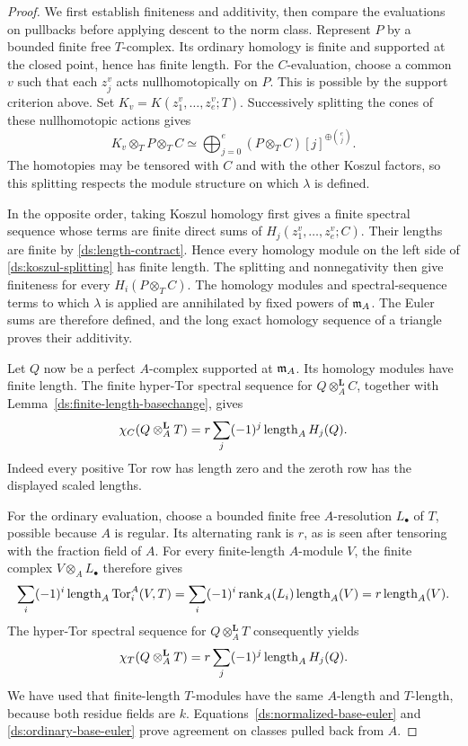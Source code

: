 \begin{proof}
We first establish finiteness and additivity, then compare the
evaluations on pullbacks before applying descent to the norm class.
Represent $P$ by a bounded finite free $T$-complex. Its ordinary
homology is finite and supported at the closed point, hence has
finite length. For the $C$-evaluation, choose a common $v$ such
that each $z_j^v$ acts nullhomotopically on $P$. This is possible
by the support criterion above. Set
$K_v=K(z_1^v,\ldots,z_e^v;T)$. Successively splitting the cones
of these nullhomotopic actions gives
\begin{equation}
 K_v\otimes_T P\otimes_T C
 \simeq
 \bigoplus_{j=0}^e
       (P\otimes_T C)[j]^{\oplus\binom ej}.
 \label{ds:koszul-splitting}
\end{equation}
The homotopies may be tensored with $C$ and with the other Koszul
factors, so this splitting respects the module structure on which
$\lambda$ is defined.

In the opposite order, taking Koszul homology first gives a finite
spectral sequence whose terms are finite direct sums of
$H_j(z_1^v,\ldots,z_e^v;C)$. Their lengths are finite by
\eqref{ds:length-contract}. Hence every homology module on the
left side of \eqref{ds:koszul-splitting} has finite length.
The splitting and nonnegativity then give finiteness for every
$H_i(P\otimes_T C)$. The homology modules and spectral-sequence terms
to which $\lambda$ is applied are annihilated by fixed powers of
$\mathfrak{m}_A$. The Euler sums are therefore defined, and the long exact
homology sequence of a triangle proves their additivity.

Let $Q$ now be a perfect $A$-complex supported at $\mathfrak{m}_A$.
Its homology modules have finite length. The finite hyper-Tor
spectral sequence for $Q\otimes_A^{\mathbf L}C$, together with
Lemma~\ref{ds:finite-length-basechange}, gives
\begin{equation}
 \chi_C(Q\otimes_A^{\mathbf L}T)
       =r\sum_j(-1)^j\operatorname{length}_A H_j(Q).
 \label{ds:normalized-base-euler}
\end{equation}
Indeed every positive Tor row has length zero and the zeroth row
has the displayed scaled lengths.

For the ordinary evaluation, choose a bounded finite free
$A$-resolution $L_\bullet$ of $T$, possible because $A$ is
regular. Its alternating rank is $r$, as is seen after tensoring
with the fraction field of $A$. For every finite-length
$A$-module $V$, the finite complex $V\otimes_A L_\bullet$
therefore gives
\[
 \sum_i(-1)^i\operatorname{length}_A\operatorname{Tor}_i^A(V,T)
   =\sum_i(-1)^i\operatorname{rank}_A(L_i)\operatorname{length}_A(V)
   =r\operatorname{length}_A(V).
\]
The hyper-Tor spectral sequence for
$Q\otimes_A^{\mathbf L}T$ consequently yields
\begin{equation}
 \chi_T(Q\otimes_A^{\mathbf L}T)
       =r\sum_j(-1)^j\operatorname{length}_A H_j(Q).
 \label{ds:ordinary-base-euler}
\end{equation}
We have used that finite-length $T$-modules have the same
$A$-length and $T$-length, because both residue fields are $k$.
Equations~\eqref{ds:normalized-base-euler} and
\eqref{ds:ordinary-base-euler} prove agreement on classes pulled
back from $A$.


\end{proof}
